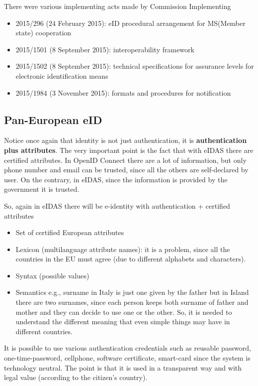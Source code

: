 There were various implementing acts made by Commission Implementing
\begin{itemize}
  \item 2015/296 (24 February 2015): eID procedural arrangement for
    MS(Member state) cooperation
  \item 2015/1501 (8 September 2015):  interoperability framework
  \item 2015/1502 (8 September 2015): technical specifications for
    assurance levels for electronic identification means
  \item 2015/1984 (3 November 2015):  formats and procedures for
    notification
\end{itemize}

\subsection{Pan-European eID}
Notice once again that identity is not just authentication, it is
\textbf{authentication plus attributes}. The very important point is
the fact that with eIDAS there are certified attributes. In OpenID
Connect there are a lot of information, but only phone number and
email can be trusted, since all the others are self-declared by user.
On the contrary, in eIDAS, since the information is provided by the
government it is trusted. 

So, again in eIDAS there will be e-identity with authentication +
certified attributes
\begin{itemize}
  \item Set of certified European attributes
  \item Lexicon (multilanguage attribute names): it is a problem,
    since all the countries in the EU must agree (due to different
    alphabets and characters).
  \item Syntax (possible values)
  \item Semantics e.g., surname in Italy is just one given by the
    father but in Island there are two surnames, since each person
    keeps both surname of father and mother and they can decide to use
    one or the other. So, it is needed to understand the different
    meaning that even simple things may have in different countries.
\end{itemize}

It is possible to use various authentication credentials such as
reusable password, one-time-password, cellphone, software certificate,
smart-card since the system is technology neutral. The point is that
it is used in a transparent way and with legal value (according to the
citizen’s country).


